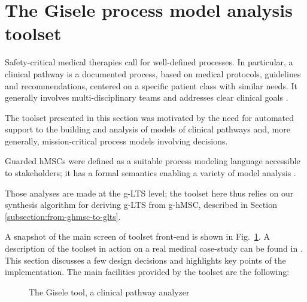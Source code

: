 \section{The Gisele process model analysis toolset\label{section:tool-clinical-pathway-analyzer}}

Safety-critical medical therapies call for well-defined processes. In particular, a clinical pathway is a documented process, based on medical protocols, guidelines and recommendations, centered on a specific patient class with similar needs. It generally involves multi-disciplinary teams and addresses clear clinical goals \cite{Middleton:2000}. 

The toolset presented in this section was motivated by the need for automated support to the building and analysis of models of clinical pathways and, more generally, mission-critical process models involving decisions. 

Guarded hMSCs were defined as a suitable process modeling language accessible to stakeholders; it has a formal semantics enabling a variety of model analysis \cite{Damas:2009, Damas:2011}. 

Those analyses are made at the g-LTS level; the toolset here thus relies on our synthesis algorithm for deriving g-LTS from g-hMSC, described in Section \ref{subsection:from-ghmsc-to-glts}.

A snapshot of the main screen of toolset front-end is shown in Fig.~\ref{image:gisele-tool}. A description of the toolset in action on a real medical case-study can be found in \cite{Damas:2011}. This section discusses a few design decisions and highlights key points of the implementation. The main facilities provided by the toolset are the following:

\begin{figure}
\centering{}
  \caption{The Gisele tool, a clinical pathway analyzer\label{image:gisele-tool}}
\end{figure}

